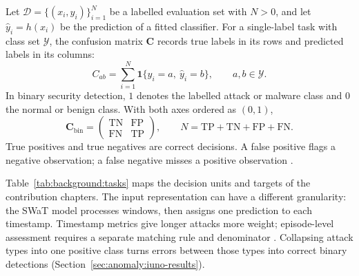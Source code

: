 Let $\mathcal D=\{(x_i,y_i)\}_{i=1}^{N}$ be a labelled evaluation set with $N>0$, and let
$\widehat y_i=h(x_i)$ be the prediction of a fitted classifier. For a single-label task with
class set $\mathcal Y$, the confusion matrix $\mathbf C$ records true labels in its rows and
predicted labels in its columns:
\begin{equation}
  C_{ab}=\sum_{i=1}^{N}\mathbf1\{y_i=a,\ \widehat y_i=b\},
  \qquad a,b\in\mathcal Y.
  \label{eq:background:confusion}
\end{equation}
In binary security detection, $1$ denotes the labelled attack or malware class and $0$ the
normal or benign class. With both axes
ordered as $(0,1)$,
\begin{equation}
  \mathbf C_{\mathrm{bin}}=
  \begin{pmatrix}\mathrm{TN}&\mathrm{FP}\\\mathrm{FN}&\mathrm{TP}\end{pmatrix},
  \qquad N=\mathrm{TP}+\mathrm{TN}+\mathrm{FP}+\mathrm{FN}.
  \label{eq:background:binary-confusion}
\end{equation}
True positives and true negatives are correct decisions. A false positive flags a negative
observation; a false negative misses a positive observation \cite{fawcett2006roc}.

Table~\ref{tab:background:tasks} maps the decision units and targets of the contribution chapters.
The input representation can have a different granularity: the SWaT model processes windows,
then assigns one prediction to each timestamp. Timestamp metrics give longer attacks more
weight; episode-level assessment requires a separate matching rule and denominator
\cite{sorbo2024navigating}. Collapsing attack types into one positive class turns errors
between those types into correct binary detections (Section~\ref{sec:anomaly:iuno-results}).

